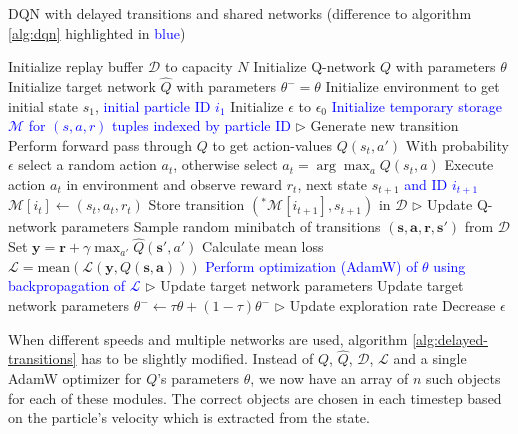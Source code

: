\begin{algorithm}[h]
    \caption{DQN with delayed transitions and shared networks (difference to algorithm \ref{alg:dqn} highlighted in \textcolor{blue}{blue})}
    \label{alg:delayed-transitions}
    \begin{algorithmic}
        \State Initialize replay buffer $\mathcal{D}$ to capacity $N$
        \State Initialize Q-network $Q$ with parameters $\theta$
        \State Initialize target network $\hat{Q}$ with parameters $\theta^-=\theta$
        \State Initialize environment to get initial state $s_1$, \textcolor{blue}{initial particle ID $i_1$}
        \State Initialize $\epsilon$ to $\epsilon_0$
        \State \textcolor{blue}{Initialize temporary storage $\mathcal{M}$ for $(s,a,r)$ tuples indexed by particle ID}
            \State $\triangleright$ Generate new transition
            \State Perform forward pass through $Q$ to get action-values $Q(s_t, a')$ 
            \State With probability $\epsilon$ select a random action $a_t$, otherwise select $a_t = \arg\!\max_a Q(s_t, a)$
            \State Execute action $a_t$ in environment and observe reward $r_t$, next state $s_{t+1}$ \textcolor{blue}{and ID $i_{t+1}$}
            \color{blue}
            \State $\mathcal{M}[i_t] \gets (s_t, a_t, r_t)$ 
                \State Store transition $(^*\mathcal{M}[i_{t+1}], s_{t+1})$ in $\mathcal{D}$
            \EndIf
            \normalcolor
            \State $\triangleright$ Update Q-network parameters
            \State Sample random minibatch of transitions $(\bm{s}, \bm{a}, \bm{r}, \bm{s'})$ from $\mathcal{D}$
            \State Set $\bm{y} = \bm{r} + \gamma \max_{a'} \hat{Q}(\bm{s'}, a')$
            \State Calculate mean loss $\mathcal{L} = \text{mean}(\mathcal{L}(\bm{y}, Q(\bm{s}, \bm{a})))$
            \State \textcolor{blue}{Perform optimization (AdamW) of $\theta$ using backpropagation of $\mathcal{L}$}
            \State $\triangleright$ Update target network parameters
            \State Update target network parameters $\theta^- \gets \tau \theta + (1 - \tau) \theta^-$
            \State $\triangleright$ Update exploration rate
            \State Decrease $\epsilon$   
        \EndFor
    \end{algorithmic}
\end{algorithm}
When different speeds and multiple networks are used, algorithm \ref{alg:delayed-transitions} has to be slightly modified. Instead of $Q$, $\hat{Q}$, $\mathcal{D}$, $\mathcal{L}$ and a single AdamW optimizer for $Q$'s parameters $\theta$, we now have an array of $n$ such objects for each of these modules. The correct objects are chosen in each timestep based on the particle's velocity which is extracted from the state. 


